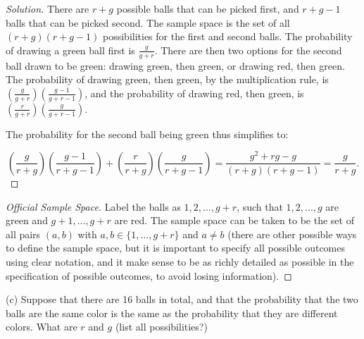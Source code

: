 \documentclass[10pt]{article}
\begin{document}
\begin{proof}[Solution]

There are $r + g$ possible balls that can be picked first, and $r + g - 1$ balls that can be picked second. The sample space is the set of all $(r + g) (r + g - 1)$ possibilities for the first and second balls. The probability of drawing a green ball first is \(\frac{g}{g + r}\). There are then two options for the second ball drawn to be green: drawing green, then green, or drawing red, then green. The probability of drawing green, then green, by the multiplication rule, is \((\frac{g}{g + r}) (\frac{g - 1}{g + r - 1})\), and the probability of drawing red, then green, is \((\frac{r}{g + r}) (\frac{g}{g + r - 1})\).

The probability for the second ball being green thus simplifies to:

\[
\left(\frac{g}{r + g}\right) \left(\frac{g - 1}{r + g - 1}\right) + \left(\frac{r}{r + g}\right) \left(\frac{g}{r + g - 1}\right) = \frac{g^2 + rg - g}{(r + g) (r + g - 1)} = \frac{g}{r + g}.
\]
\end{proof}

\begin{proof}[Official Sample Space]
Label the balls as $1, 2,...,g+r$, such that $1, 2,...,g$ are green and $g+1,...,g+r$
are red. The sample space can be taken to be the set of all pairs $(a, b)$ with $a, b \in
\{1,...,g + r\}$ and $a \neq b$ (there are other possible ways to define the sample space,
but it is important to specify all possible outcomes using clear notation, and it make
sense to be as richly detailed as possible in the specification of possible outcomes,
to avoid losing information). 
\end{proof}
(c) Suppose that there are 16 balls in total, and that the probability that the two balls are the same color is the same as the probability that they are different colors. What are $r$ and $g$ (list all possibilities?)
\end{document}
